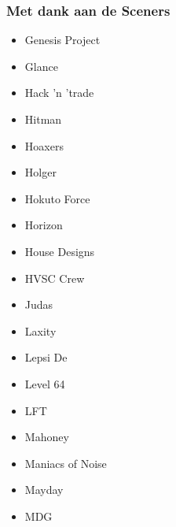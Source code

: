 \begin{frame}[noframenumbering]
\frametitle{Met dank aan de Sceners}

\begin{multicols}{3}
\begin{itemize}
\item Genesis Project
\item Glance
\item Hack 'n 'trade
\item Hitman
\item Hoaxers
\item Holger
\item Hokuto Force
\item Horizon
\item House Designs
\item HVSC Crew
\item Judas
\item Laxity
\item Lepsi De
\item Level 64
\item LFT
\item Mahoney
\item Maniacs of Noise
\item Mayday
\item MDG
\end{itemize}
\end{multicols}

\end{frame}


